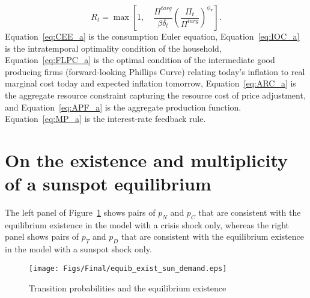 \documentclass[11pt]{article}
\begin{document}
\begin{singlespace}
		\begin{equation}
			R_{t} = \max \left[1, \quad\frac{\Pi^{targ}}{\beta\delta_t}\left(\frac{\Pi_{t}}{\Pi^{targ}}\right)^{\phi_{\pi}}\right]. \label{eq:MP_a}
		\end{equation}
		\normalsize{Equation~\ref{eq:CEE_a} is the consumption Euler equation, Equation~\ref{eq:IOC_a} is the intratemporal optimality condition of the household, Equation~\ref{eq:FLPC_a} is the optimal condition of the intermediate good producing firms (forward-looking Phillips Curve) relating today's inflation to real marginal cost today and expected inflation tomorrow, Equation~\ref{eq:ARC_a} is the aggregate resource constraint capturing the resource cost of price adjustment, and Equation~\ref{eq:APF_a} is the aggregate production function. Equation~\ref{eq:MP_a} is the interest-rate feedback rule.}
		
		
		\section{On the existence and multiplicity of a sunspot equilibrium}
		\label{A:Existence}
				
		The left panel of Figure~\ref{fig:Existence} shows pairs of $p_{N}$ and $p_{C}$ that are consistent with the equilibrium existence in the model with a crisis shock only, whereas the right panel shows pairs of $p_{T}$ and $p_{D}$ that are consistent with the equilibrium existence in the model with a sunspot shock only.
		
		\begin{figure}[!ht]
			\begin{center}
				\caption{Transition probabilities and the equilibrium existence\label{fig:Existence}}
				\texttt{[image: Figs/Final/equib\_exist\_sun\_demand.eps]}\\
			\end{center}
		\end{figure}
		

\end{singlespace}
\end{document}
